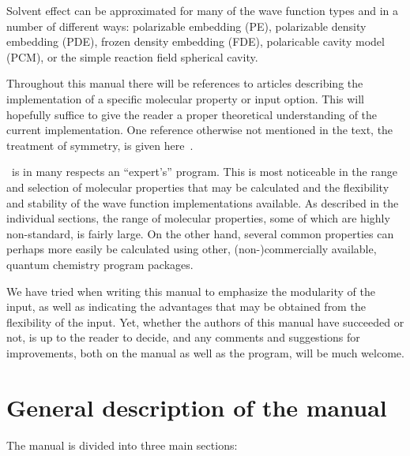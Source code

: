 Solvent effect can be approximated for many of the wave function types and in a number of different ways:
polarizable embedding (PE), polarizable density embedding (PDE),
frozen density embedding (FDE), polaricable cavity model (PCM), or the simple reaction field spherical cavity.


Throughout this manual there will be references to articles
describing the implementation of a specific molecular property or
input option. This will hopefully suffice to give the reader a proper
theoretical understanding of the current implementation. One
reference otherwise not mentioned in the text, the treatment of
symmetry, is given here~\cite{prttca69}.

\dalton\ is in many respects an ``expert's'' program. This is most
noticeable in the range and selection of molecular properties that may
be calculated and the flexibility and stability of the wave function
implementations available. As described in the individual sections, the range of
molecular properties, some of which are highly non-standard, is fairly
large. On the other hand, several common properties can perhaps more
easily be calculated using other, (non-)commercially available, quantum
chemistry program packages.

We have tried when writing this manual to emphasize the modularity of
the input, as well as indicating  the advantages that may be obtained from
the flexibility of the input. Yet, whether the authors of
this manual have succeeded or not, is up to the reader to decide, and
any comments and suggestions for improvements, both on the manual as
well as the program, will be much welcome.

\section{General description of the manual}

The manual is divided into three main sections:

